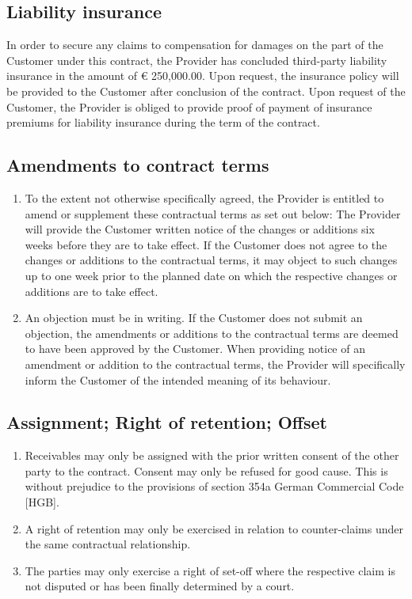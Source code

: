 \documentclass{terms}
\begin{document}
\subsection{Liability insurance}
In order to secure any claims to compensation for damages on the part of the Customer under this contract, the Provider has concluded third-party liability insurance in the amount of € 250,000.00. Upon request, the insurance policy will be provided to the Customer after conclusion of the contract. Upon request of the Customer, the Provider is obliged to provide proof of payment of insurance premiums for liability insurance during the term of the contract.
\subsection{Amendments to contract terms}
\begin{enumerate}
\item To the extent not otherwise specifically agreed, the Provider is entitled to amend or supplement these contractual terms as set out below: The Provider will provide the Customer written notice of the changes or additions six weeks before they are to take effect. If the Customer does not agree to the changes or additions to the contractual terms, it may object to such changes up to one week prior to the planned date on which the respective changes or additions are to take effect. 
\item An objection must be in writing. If the Customer does not submit an objection, the amendments or additions to the contractual terms are deemed to have been approved by the Customer. When providing notice of an amendment or addition to the contractual terms, the Provider will specifically inform the Customer of the intended meaning of its behaviour.
\end{enumerate}
\subsection{Assignment; Right of retention; Offset}
\begin{enumerate}
\item Receivables may only be assigned with the prior written consent of the other party to the contract. Consent may only be refused for good cause. This is without prejudice to the provisions of section 354a German Commercial Code [HGB].
\item A right of retention may only be exercised in relation to counter-claims under the same contractual relationship.
\item The parties may only exercise a right of set-off where the respective claim is not disputed or has been finally determined by a court.
\end{enumerate}
\end{document}
